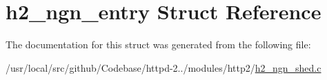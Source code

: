 \hypertarget{structh2__ngn__entry}{}\section{h2\+\_\+ngn\+\_\+entry Struct Reference}
\label{structh2__ngn__entry}


The documentation for this struct was generated from the following file\+:\begin{DoxyCompactItemize}
\item 
/usr/local/src/github/\+Codebase/httpd-\/2../modules/http2/\hyperlink{h2__ngn__shed_8c}{h2\+\_\+ngn\+\_\+shed.\+c}\end{DoxyCompactItemize}
